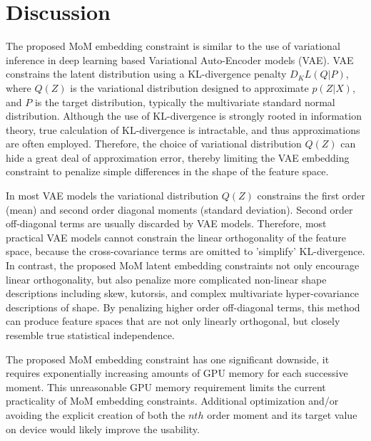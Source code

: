 \documentclass[10pt,twocolumn,letterpaper]{article}
\begin{document}
\section{Discussion}

The proposed MoM embedding constraint is similar to the use of variational inference in deep learning based Variational Auto-Encoder models (VAE).
VAE constrains the latent distribution using a KL-divergence penalty $D_KL(Q|P)$, where $Q(Z)$ is the variational distribution designed to approximate $p(Z|X)$, and $P$ is the target distribution, typically the multivariate standard normal distribution. 
Although the use of KL-divergence is strongly rooted in information theory, true calculation of KL-divergence is intractable, and thus approximations are often employed. 
Therefore, the choice of variational distribution $Q(Z)$ can hide a great deal of approximation error, thereby limiting the VAE embedding constraint to penalize simple differences in the shape of the feature space.

In most VAE models the variational distribution $Q(Z)$ constrains the first order (mean) and second order diagonal moments (standard deviation).
Second order off-diagonal terms are usually discarded by VAE models.  
Therefore, most practical VAE models cannot constrain the linear orthogonality of the feature space, because the cross-covariance terms are omitted to 'simplify' KL-divergence.
In contrast, the proposed MoM latent embedding constraints not only encourage linear orthogonality, but also penalize more complicated non-linear shape descriptions including skew, kutorsis, and complex multivariate hyper-covariance descriptions of shape.  
By penalizing higher order off-diagonal terms, this method can produce feature spaces that are not only linearly orthogonal, but closely resemble true statistical independence.

The proposed MoM embedding constraint has one significant downside, it requires exponentially increasing amounts of GPU memory for each successive moment.
This unreasonable GPU memory requirement limits the current practicality of MoM embedding constraints. 
Additional optimization and/or avoiding the explicit creation of both the $nth$ order moment and its target value on device would likely improve the usability.
\end{document}
